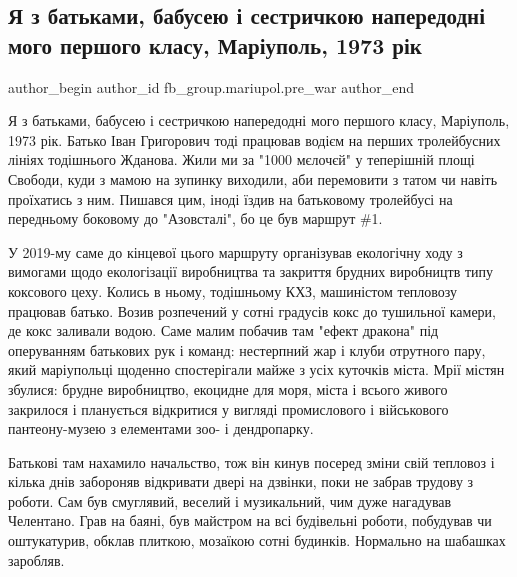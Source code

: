  
 
 
 
 

\subsection{Я з батьками, бабусею і сестричкою напередодні мого першого класу, Маріуполь, 1973 рік}
\label{sec:10_03_2023.fb.fb_group.mariupol.pre_war.1.ya_z_batkami__babuse}

\ifcmt
 author_begin
   author_id fb_group.mariupol.pre_war
 author_end
\fi


Я з батьками, бабусею і сестричкою напередодні мого першого класу, Маріуполь,
1973 рік. Батько Іван Григорович тоді працював водієм на перших тролейбусних
лініях тодішнього Жданова. Жили ми за "1000 мєлочєй" у теперішній площі
Свободи, куди з мамою на зупинку виходили, аби перемовити з татом чи навіть
проїхатись з ним. Пишався цим, іноді їздив на батьковому тролейбусі на
передньому боковому до "Азовсталі", бо це був маршрут \#1. 

У 2019-му саме до кінцевої цього маршруту організував екологічну ходу з
вимогами щодо екологізації виробництва та закриття брудних виробництв типу
коксового цеху. Колись в ньому, тодішньому КХЗ, машиністом тепловозу працював
батько. Возив розпечений у сотні градусів кокс до тушильної камери, де кокс
заливали водою. Саме малим побачив там "ефект дракона" під оперуванням
батькових рук і команд: нестерпний жар і клуби отрутного пару, який маріупольці
щоденно спостерігали майже з усіх куточків міста. Мрії містян збулися: брудне
виробництво, екоцидне для моря, міста і всього живого закрилося і планується
відкритися у вигляді промислового і військового пантеону-музею з елементами
зоо- і дендропарку.

Батькові там нахамило начальство, тож він кинув посеред зміни свій тепловоз і
кілька днів забороняв відкривати двері на дзвінки, поки не забрав трудову з
роботи. Сам був смуглявий, веселий і музикальний, чим дуже нагадував Челентано.
Грав на баяні, був майстром на всі будівельні роботи, побудував чи оштукатурив,
обклав плиткою, мозаїкою сотні будинків. Нормально на шабашках заробляв. 

